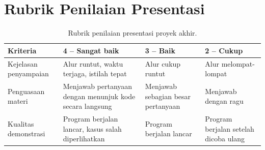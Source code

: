 \section{Rubrik Penilaian Presentasi}

\begin{table}[H]
    \centering
    \caption{Rubrik penilaian presentasi proyek akhir.}
    \label{tab:app-rubrik-presentasi}
    \footnotesize
    \begin{tabular}{@{}p{3.0cm}p{3.4cm}p{3.4cm}p{3.4cm}@{}}
        \toprule
        \textbf{Kriteria} & \textbf{4 -- Sangat baik} &
        \textbf{3 -- Baik} & \textbf{2 -- Cukup} \\
        \midrule
        Kejelasan penyampaian & Alur runtut, waktu terjaga, istilah
        tepat & Alur cukup runtut & Alur melompat-lompat \\
        \addlinespace
        Penguasaan materi & Menjawab pertanyaan dengan menunjuk kode
        secara langsung & Menjawab sebagian besar pertanyaan &
        Menjawab dengan ragu \\
        \addlinespace
        Kualitas demonstrasi & Program berjalan lancar, kasus salah
        diperlihatkan & Program berjalan lancar & Program berjalan
        setelah dicoba ulang \\
        \bottomrule
    \end{tabular}
\end{table}
